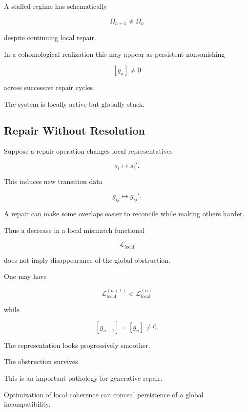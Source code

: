 \documentclass[
  11pt,
  a4paper,
  DIV=12,
  BCOR=0mm,
  parskip=half-
]{scrartcl}
\theoremstyle{definition}
\theoremstyle{plain}
\theoremstyle{remark}
\begin{document}
A stalled regime has schematically

\[
  \Omega_{n+1}\not\prec\Omega_n
\]

despite continuing local repair.

In a cohomological realization this may appear as persistent nonvanishing

\[
  [g_n]\neq 0
\]

across successive repair cycles.

The system is locally active but globally stuck.


\subsection{Repair Without Resolution}
\label{app:repair-moves-obstruction}

Suppose a repair operation changes local representatives

\[
  s_i\mapsto s_i'.
\]

This induces new transition data

\[
  g_{ij}\mapsto g_{ij}'.
\]

A repair can make some overlaps easier to reconcile while making others
harder.

Thus a decrease in a local mismatch functional

\[
  \mathcal L_{\mathrm{local}}
\]

does not imply disappearance of the global obstruction.

One may have

\[
  \mathcal L_{\mathrm{local}}^{(n+1)}
  <
  \mathcal L_{\mathrm{local}}^{(n)}
\]

while

\[
  [g_{n+1}]
  =
  [g_n]
  \neq 0.
\]

The representation looks progressively smoother.

The obstruction survives.

This is an important pathology for generative repair.

Optimization of local coherence can conceal persistence of a global
incompatibility.

\end{document}

